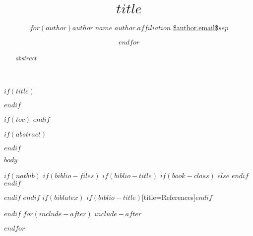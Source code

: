 \documentclass[11pt,article,oneside]{memoir}
\title{\bigskip \bigskip $title$}
\author{$for(author)$\Large $author.name$\vspace{0.05in} \newline\normalsize\emph{$author.affiliation$} \newline\footnotesize \url{$author.email$}\vspace*{0.2in}\newline $sep$ \and $endfor$}
\date{}
\begin{document}
  
\setsansfont[Mapping=tex-text]{Minion Pro} 
\setmonofont[Mapping=tex-text,Scale=0.8]{Pragmata}
\pagestyle{kjh}


$if(title)$
\maketitle
$endif$

$if(toc)$
{
\hypersetup{linkcolor=black}
\setcounter{tocdepth}{$toc-depth$}
\tableofcontents
}
$endif$

$if(abstract)$

\begin{abstract}

\noindent $abstract$

\end{abstract}

$endif$

$body$


$if(natbib)$
$if(biblio-files)$
$if(biblio-title)$
$if(book-class)$
\renewcommand\bibname{Bibliography}
$else$
\renewcommand\refname{References}
$endif$
$endif$


$endif$
$endif$
$if(biblatex)$
\printbibliography$if(biblio-title)$[title=References]$endif$

$endif$
$for(include-after)$
$include-after$

$endfor$
\end{document}
